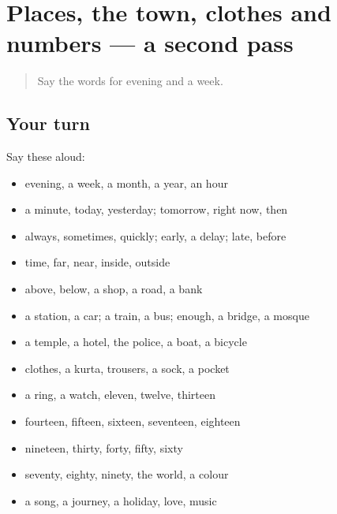 \section[(dialogue)]{Places, the town, clothes and numbers — a second pass}

\label{lesson:UR-R87-second-pass-places-the-town-clothes-and-numbers}



\begin{quote}
Say the words for evening and a week.
\end{quote}

\subsection*{Your turn}
Say these aloud:

\begin{itemize}
\raggedright
  \item evening, a week, a month, a year, an hour
  \item a minute, today, yesterday; tomorrow, right now, then
  \item always, sometimes, quickly; early, a delay; late, before
  \item time, far, near, inside, outside
  \item above, below, a shop, a road, a bank
  \item a station, a car; a train, a bus; enough, a bridge, a mosque
  \item a temple, a hotel, the police, a boat, a bicycle
  \item clothes, a kurta, trousers, a sock, a pocket
  \item a ring, a watch, eleven, twelve, thirteen
  \item fourteen, fifteen, sixteen, seventeen, eighteen
  \item nineteen, thirty, forty, fifty, sixty
  \item seventy, eighty, ninety, the world, a colour
  \item a song, a journey, a holiday, love, music
\end{itemize}

